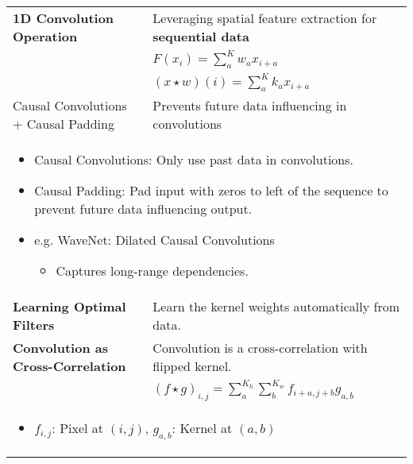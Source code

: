 \begin{summary}
    \begin{center}
        \begin{tabular}{ll}
            \toprule
            \textbf{1D Convolution Operation} & Leveraging spatial feature extraction for \textbf{sequential data} \\
            & $F(x_i) = \sum_a^{K} w_{a} x_{i+a}$ \\
            & $(x \star w)(i) = \sum_a^{K} k_a x_{i+a}$ \\
            \midrule
            Causal Convolutions + Causal Padding & Prevents future data influencing in convolutions \\ 
            \multicolumn{2}{p{\linewidth}}{
                \begin{itemize}
                    \item Causal Convolutions: Only use past data in convolutions.
                    \item Causal Padding: Pad input with zeros to left of the sequence to prevent future data influencing output.
                    \item e.g. WaveNet: Dilated Causal Convolutions
                    \begin{itemize}
                        \item Captures long-range dependencies.
                    \end{itemize}
                \end{itemize}} \\
            \toprule
            \textbf{Learning Optimal Filters} & Learn the kernel weights automatically from data. \\
            \toprule
            \textbf{Convolution as Cross-Correlation} & Convolution is a cross-correlation with flipped kernel. \\
            & $(f \star g)_{i,j} = \sum_a^{K_h} \sum_b^{K_w} f_{i+a,j+b} g_{a,b}$ \\
            \multicolumn{2}{p{\linewidth}}{
                \begin{itemize}
                    \item $f_{i,j}$: Pixel at $(i,j)$, $g_{a,b}$: Kernel at $(a,b)$
                \end{itemize}} \\
            \bottomrule
        \end{tabular}
    \end{center}
\end{summary}

